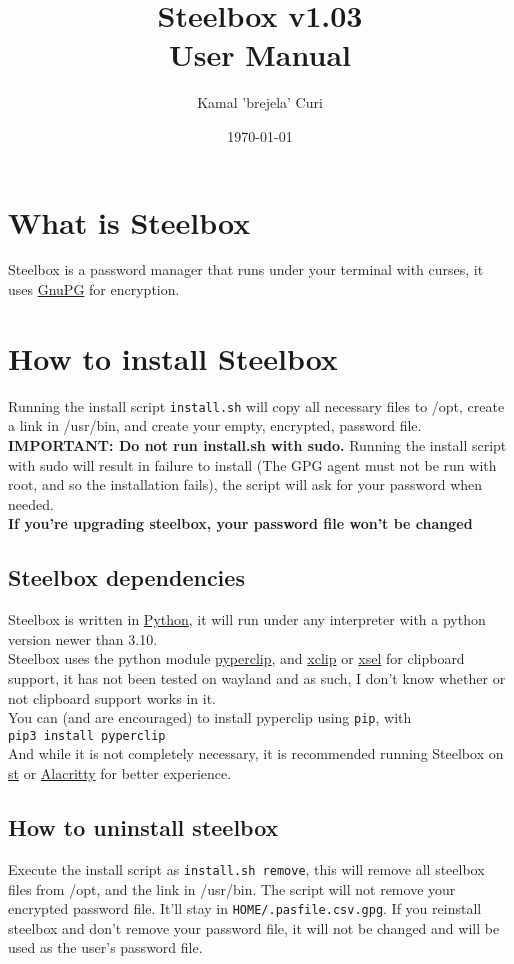 \documentclass{article}
\title{\textbf{Steelbox v1.03} \\ User Manual}
\date{\today}
\author{Kamal 'brejela' Curi}
\begin{document}
  \maketitle
  \tableofcontents
  \newpage

  \section{What is Steelbox}
  Steelbox is a password manager that runs under your terminal with curses, it
  uses \href{https://gnupg.org/}{GnuPG} for encryption.

  \section{How to install Steelbox}
  Running the install script \texttt{install.sh} will copy all necessary files to /opt, create a link in /usr/bin,
  and create your empty, encrypted, password file. \textbf{IMPORTANT: Do not run install.sh with sudo.}
  Running the install script with sudo will result in failure to install (The GPG agent must not be run with root, and so the installation fails),
  the script will ask for your password when needed.\\
  \textbf{If you're upgrading steelbox, your password file won't be changed}
  \subsection{Steelbox dependencies}
  Steelbox is written in \href{https://www.python.org/}{Python}, it will run under any interpreter with a python
  version newer than 3.10.
  \\
  Steelbox uses the python module \href{https://github.com/asweigart/pyperclip}{pyperclip}, and
   \href{https://github.com/astrand/xclip}{xclip} or \href{https://github.com/kfish/xsel}{xsel}
  for clipboard support, it has not been tested on wayland and as such, I don't know whether or not clipboard
  support works in it. \\
  You can (and are encouraged) to install pyperclip using \texttt{pip}, with \\
  \texttt{pip3 install pyperclip}\\
  And while it is not completely necessary, it is recommended running Steelbox
  on \href{https://st.suckless.org/}{st} or \href{https://alacritty.org/}{Alacritty} for better experience.
  \subsection{How to uninstall steelbox}
  Execute the install script as \texttt{install.sh remove}, this will remove all steelbox files from /opt, and the link in /usr/bin.
  The script will not remove your encrypted password file. It'll stay in \texttt{\textdollar HOME/.pasfile.csv.gpg}.
  If you reinstall steelbox and don't remove your password file, it will not be changed and will be used as the user's password file.
\end{document}
